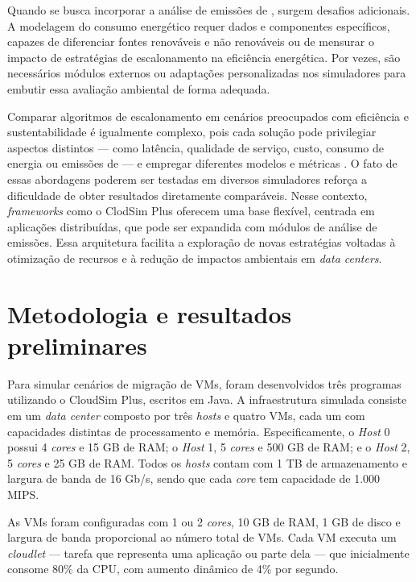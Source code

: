 \documentclass[12pt]{article}
\begin{document}
Quando se busca incorporar a análise de emissões de , surgem desafios adicionais. A modelagem do consumo energético requer dados e componentes específicos, capazes de diferenciar fontes renováveis e não renováveis ou de mensurar o impacto de estratégias de escalonamento na eficiência energética. Por vezes, são necessários módulos externos ou adaptações personalizadas nos simuladores para embutir essa avaliação ambiental de forma adequada.

Comparar algoritmos de escalonamento em cenários preocupados com eficiência e sustentabilidade é igualmente complexo, pois cada solução pode privilegiar aspectos distintos --- como latência, qualidade de serviço, custo, consumo de energia ou emissões de  --- e empregar diferentes modelos e métricas \cite{kumar:19}. O fato de essas abordagens poderem ser testadas em diversos simuladores reforça a dificuldade de obter resultados diretamente comparáveis. Nesse contexto, \textit{frameworks} como o ClodSim Plus \cite{silva:17} oferecem uma base flexível, centrada em aplicações distribuídas, que pode ser expandida com módulos de análise de emissões. Essa arquitetura facilita a exploração de novas estratégias voltadas à otimização de recursos e à redução de impactos ambientais em \textit{data centers}.

\section{Metodologia e resultados preliminares}

Para simular cenários de migração de VMs, foram desenvolvidos três programas utilizando o CloudSim Plus, escritos em Java. A infraestrutura simulada consiste em um \textit{data center} composto por três \textit{hosts} e quatro VMs, cada um com capacidades distintas de processamento e memória. Especificamente, o \textit{Host} 0 possui 4 \textit{cores} e 15 GB de RAM; o \textit{Host} 1, 5 \textit{cores} e 500 GB de RAM; e o \textit{Host} 2, 5 \textit{cores} e 25 GB de RAM. Todos os \textit{hosts} contam com 1 TB de armazenamento e largura de banda de 16 Gb/s, sendo que cada \textit{core} tem capacidade de 1.000 MIPS.

As VMs foram configuradas com 1 ou 2 \textit{cores}, 10 GB de RAM, 1 GB de disco e largura de banda proporcional ao número total de VMs. Cada VM executa um \textit{cloudlet} --- tarefa que representa uma aplicação ou parte dela --- que inicialmente consome 80\% da CPU, com aumento dinâmico de 4\% por segundo.
\end{document}
